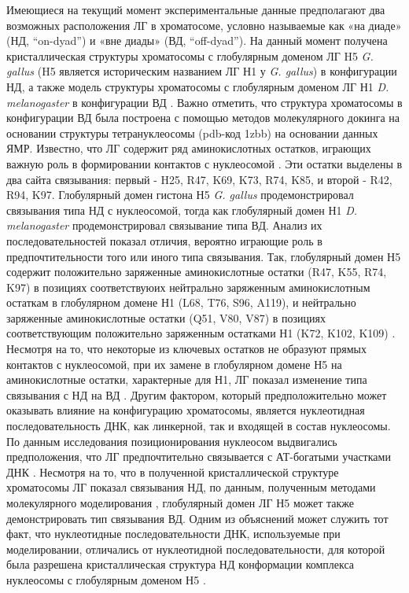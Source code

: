 Имеющиеся на текущий момент экспериментальные данные \cite{bednar_structure_2017,zhou_structural_2013,zhou_structural_2015,zhou_small_2016} предполагают два возможных расположения ЛГ в хроматосоме, условно называемые как «на диаде» (НД, ``on-dyad'') и «вне диады» (ВД, ``off-dyad''). На данный момент получена кристаллическая структуры хроматосомы с глобулярным доменом ЛГ H5 \textit{G. gallus} (H5 является историческим названием ЛГ Н1 у \textit{G. gallus}) в конфигурации НД, а также модель структуры хроматосомы с глобулярным доменом ЛГ Н1 \textit{D. melanogaster} в конфигурации ВД \cite{zhou_structural_2015}. Важно отметить, что структура хроматосомы в конфигурации ВД была построена с помощью методов молекулярного докинга на основании структуры тетрануклеосомы (pdb-код 1zbb) на основании данных ЯМР. 
Известно, что ЛГ содержит ряд аминокислотных остатков, играющих важную роль в формировании контактов с нуклеосомой \cite{brown_mapping_2006}. Эти остатки выделены в два сайта связывания: первый - H25, R47, K69, K73, R74, K85, и второй - R42, R94, K97.
Глобулярный домен гистона Н5 \textit{G. gallus} продемонстрировал связывания типа НД с нуклеосомой, тогда как глобулярный домен Н1 \textit{D. melanogaster} продемонстрировал связывание типа ВД. Анализ их последовательностей показал отличия, вероятно играющие роль в предпочтительности того или иного типа связывания. Так, глобулярный домен Н5 содержит положительно заряженные аминокислотные остатки (R47, K55, R74, K97) в позициях соответствуюих нейтрально заряженным аминокислотным остаткам в глобулярном домене Н1 (L68, T76, S96, A119), и нейтрально заряженные аминокислотные остатки (Q51, V80, V87) в позициях соответствующим положительно заряженным остатками Н1 (K72, K102, K109) \cite{zhou_structural_2015,zhou_small_2016}. Несмотря на то, что некоторые из ключевых остатков не образуют прямых контактов с нуклеосомой, при их замене в глобулярном домене Н5 на аминокислотные остатки, характерные для Н1, ЛГ показал изменение типа связывания с НД на ВД \cite{zhou_small_2016}.
Другим фактором, который предположительно может оказывать влияние на конфигурацию хроматосомы, является нуклеотидная последовательность ДНК, как линкерной, так и входящей в состав нуклеосомы. По данным исследования позиционирования нуклеосом выдвигались предположения, что ЛГ предпочтительно связывается с АТ-богатыми участками ДНК \cite{cui_distinctive_2009}. 
Несмотря на то, что в полученной кристаллической структуре хроматосомы ЛГ показал связывания НД, по данным, полученным методами молекулярного моделирования \cite{ozturk_conformational_2016,pachov_structure_2011}, глобулярный домен ЛГ Н5 может также демонстрировать тип связывания ВД. Одним из объяснений может служить тот факт, что нуклеотидные последовательности ДНК, используемые при моделировании, отличались от нуклеотидной последовательности, для которой была разрешена кристаллическая структура НД конформации комплекса нуклеосомы с глобулярным доменом Н5 \cite{zhou_structural_2015}.
